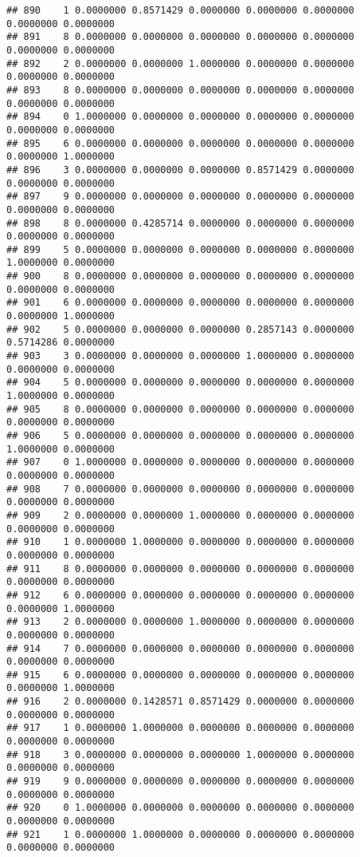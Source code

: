\documentclass[
]{article}
\begin{document}
\begin{verbatim}
## 890    1 0.0000000 0.8571429 0.0000000 0.0000000 0.0000000 0.0000000 0.0000000
## 891    8 0.0000000 0.0000000 0.0000000 0.0000000 0.0000000 0.0000000 0.0000000
## 892    2 0.0000000 0.0000000 1.0000000 0.0000000 0.0000000 0.0000000 0.0000000
## 893    8 0.0000000 0.0000000 0.0000000 0.0000000 0.0000000 0.0000000 0.0000000
## 894    0 1.0000000 0.0000000 0.0000000 0.0000000 0.0000000 0.0000000 0.0000000
## 895    6 0.0000000 0.0000000 0.0000000 0.0000000 0.0000000 0.0000000 1.0000000
## 896    3 0.0000000 0.0000000 0.0000000 0.8571429 0.0000000 0.0000000 0.0000000
## 897    9 0.0000000 0.0000000 0.0000000 0.0000000 0.0000000 0.0000000 0.0000000
## 898    8 0.0000000 0.4285714 0.0000000 0.0000000 0.0000000 0.0000000 0.0000000
## 899    5 0.0000000 0.0000000 0.0000000 0.0000000 0.0000000 1.0000000 0.0000000
## 900    8 0.0000000 0.0000000 0.0000000 0.0000000 0.0000000 0.0000000 0.0000000
## 901    6 0.0000000 0.0000000 0.0000000 0.0000000 0.0000000 0.0000000 1.0000000
## 902    5 0.0000000 0.0000000 0.0000000 0.2857143 0.0000000 0.5714286 0.0000000
## 903    3 0.0000000 0.0000000 0.0000000 1.0000000 0.0000000 0.0000000 0.0000000
## 904    5 0.0000000 0.0000000 0.0000000 0.0000000 0.0000000 1.0000000 0.0000000
## 905    8 0.0000000 0.0000000 0.0000000 0.0000000 0.0000000 0.0000000 0.0000000
## 906    5 0.0000000 0.0000000 0.0000000 0.0000000 0.0000000 1.0000000 0.0000000
## 907    0 1.0000000 0.0000000 0.0000000 0.0000000 0.0000000 0.0000000 0.0000000
## 908    7 0.0000000 0.0000000 0.0000000 0.0000000 0.0000000 0.0000000 0.0000000
## 909    2 0.0000000 0.0000000 1.0000000 0.0000000 0.0000000 0.0000000 0.0000000
## 910    1 0.0000000 1.0000000 0.0000000 0.0000000 0.0000000 0.0000000 0.0000000
## 911    8 0.0000000 0.0000000 0.0000000 0.0000000 0.0000000 0.0000000 0.0000000
## 912    6 0.0000000 0.0000000 0.0000000 0.0000000 0.0000000 0.0000000 1.0000000
## 913    2 0.0000000 0.0000000 1.0000000 0.0000000 0.0000000 0.0000000 0.0000000
## 914    7 0.0000000 0.0000000 0.0000000 0.0000000 0.0000000 0.0000000 0.0000000
## 915    6 0.0000000 0.0000000 0.0000000 0.0000000 0.0000000 0.0000000 1.0000000
## 916    2 0.0000000 0.1428571 0.8571429 0.0000000 0.0000000 0.0000000 0.0000000
## 917    1 0.0000000 1.0000000 0.0000000 0.0000000 0.0000000 0.0000000 0.0000000
## 918    3 0.0000000 0.0000000 0.0000000 1.0000000 0.0000000 0.0000000 0.0000000
## 919    9 0.0000000 0.0000000 0.0000000 0.0000000 0.0000000 0.0000000 0.0000000
## 920    0 1.0000000 0.0000000 0.0000000 0.0000000 0.0000000 0.0000000 0.0000000
## 921    1 0.0000000 1.0000000 0.0000000 0.0000000 0.0000000 0.0000000 0.0000000

\end{verbatim}
\end{document}
